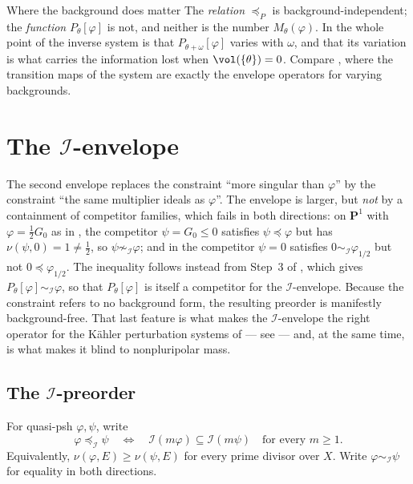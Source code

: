 \begin{warning}{Where the background does matter}
\label{warn:ch51-background}
The \emph{relation} $\preceq_P$ is background-independent; the
\emph{function} $P_\theta[\varphi]$ is not, and neither is the
number $M_\theta(\varphi)$.  In
 the whole point of the inverse system
is that $P_{\theta+\omega}[\varphi]$ varies with $\omega$, and that
its variation is what carries the information lost when
$\vol(\{\theta\})=0$.  Compare
, where the transition maps of the
system are exactly the envelope operators for varying backgrounds.
\end{warning}

\section{The \texorpdfstring{$\mathcal I$}{I}-envelope}
\label{sec:ch51-i-envelope}

The second envelope replaces the constraint ``more singular than
$\varphi$'' by the constraint ``the same multiplier ideals as
$\varphi$''.  The envelope is larger, but \emph{not} by a containment of
competitor families, which fails in both directions: on $\mathbf P^1$
with $\varphi=\tfrac12G_0$ as in , the
competitor $\psi=G_0\leq0$ satisfies $\psi\preceq\varphi$ but has
$\nu(\psi,0)=1\neq\tfrac12$, so $\psi\not\sim_{\mathcal I}\varphi$;
and in  the competitor $\psi=0$ satisfies
$0\sim_{\mathcal I}\varphi_{1/2}$ but not $0\preceq\varphi_{1/2}$.  The
inequality follows instead from Step~3 of
, which gives
$P_\theta[\varphi]\sim_{\mathcal I}\varphi$, so that
$P_\theta[\varphi]$ is itself a competitor for the
$\mathcal I$-envelope.  Because the constraint refers to no background
form, the resulting
preorder is manifestly background-free.  That last feature is what makes
the $\mathcal I$-envelope the right operator for the K\"ahler
perturbation systems of  --- see
 --- and, at the same time, is what
makes it blind to nonpluripolar mass.

\subsection{The \texorpdfstring{$\mathcal I$}{I}-preorder}
\label{sec:ch51-i-preorder}

\begin{definition}
\label{def:complex-i-preorder}
For quasi-psh $\varphi,\psi$, write
\[
 \varphi\preceq_{\mathcal I}\psi
 \quad\Longleftrightarrow\quad
 \mathcal I(m\varphi)\subseteq\mathcal I(m\psi)
 \quad\text{for every }m\geq1.
\tag{51.27}\label{eq:complex-i-preorder}
\]
Equivalently, $\nu(\varphi,E)\geq\nu(\psi,E)$ for every prime divisor
over $X$.  Write $\varphi\sim_{\mathcal I}\psi$ for equality in both
directions.
\end{definition}

